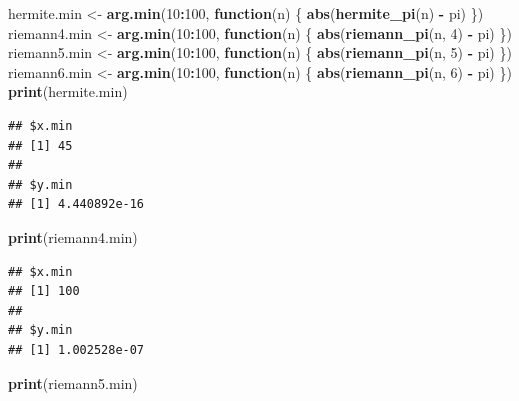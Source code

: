 \documentclass[
  12pt,
]{paper}
\newenvironment{Shaded}{\begin{snugshade}}{\end{snugshade}}
\newcommand{\ControlFlowTok}[1]{\textcolor[rgb]{0.13,0.29,0.53}{\textbf{#1}}}
\newcommand{\DecValTok}[1]{\textcolor[rgb]{0.00,0.00,0.81}{#1}}
\newcommand{\FunctionTok}[1]{\textcolor[rgb]{0.13,0.29,0.53}{\textbf{#1}}}
\newcommand{\NormalTok}[1]{#1}
\newcommand{\OtherTok}[1]{\textcolor[rgb]{0.56,0.35,0.01}{#1}}
\newcommand{\SpecialCharTok}[1]{\textcolor[rgb]{0.81,0.36,0.00}{\textbf{#1}}}
\begin{document}
\begin{Shaded}
\begin{Highlighting}[]
\NormalTok{hermite.min }\OtherTok{\textless{}{-}} \FunctionTok{arg.min}\NormalTok{(}\DecValTok{10}\SpecialCharTok{:}\DecValTok{100}\NormalTok{, }\ControlFlowTok{function}\NormalTok{(n) \{}
    \FunctionTok{abs}\NormalTok{(}\FunctionTok{hermite\_pi}\NormalTok{(n) }\SpecialCharTok{{-}}\NormalTok{ pi)}
\NormalTok{\})}
\NormalTok{riemann4.min }\OtherTok{\textless{}{-}} \FunctionTok{arg.min}\NormalTok{(}\DecValTok{10}\SpecialCharTok{:}\DecValTok{100}\NormalTok{, }\ControlFlowTok{function}\NormalTok{(n) \{}
    \FunctionTok{abs}\NormalTok{(}\FunctionTok{riemann\_pi}\NormalTok{(n, }\DecValTok{4}\NormalTok{) }\SpecialCharTok{{-}}\NormalTok{ pi)}
\NormalTok{\})}
\NormalTok{riemann5.min }\OtherTok{\textless{}{-}} \FunctionTok{arg.min}\NormalTok{(}\DecValTok{10}\SpecialCharTok{:}\DecValTok{100}\NormalTok{, }\ControlFlowTok{function}\NormalTok{(n) \{}
    \FunctionTok{abs}\NormalTok{(}\FunctionTok{riemann\_pi}\NormalTok{(n, }\DecValTok{5}\NormalTok{) }\SpecialCharTok{{-}}\NormalTok{ pi)}
\NormalTok{\})}
\NormalTok{riemann6.min }\OtherTok{\textless{}{-}} \FunctionTok{arg.min}\NormalTok{(}\DecValTok{10}\SpecialCharTok{:}\DecValTok{100}\NormalTok{, }\ControlFlowTok{function}\NormalTok{(n) \{}
    \FunctionTok{abs}\NormalTok{(}\FunctionTok{riemann\_pi}\NormalTok{(n, }\DecValTok{6}\NormalTok{) }\SpecialCharTok{{-}}\NormalTok{ pi)}
\NormalTok{\})}
\FunctionTok{print}\NormalTok{(hermite.min)}
\end{Highlighting}
\end{Shaded}

\begin{verbatim}
## $x.min
## [1] 45
## 
## $y.min
## [1] 4.440892e-16
\end{verbatim}

\begin{Shaded}
\begin{Highlighting}[]
\FunctionTok{print}\NormalTok{(riemann4.min)}
\end{Highlighting}
\end{Shaded}

\begin{verbatim}
## $x.min
## [1] 100
## 
## $y.min
## [1] 1.002528e-07
\end{verbatim}

\begin{Shaded}
\begin{Highlighting}[]
\FunctionTok{print}\NormalTok{(riemann5.min)}
\end{Highlighting}
\end{Shaded}
\end{document}
